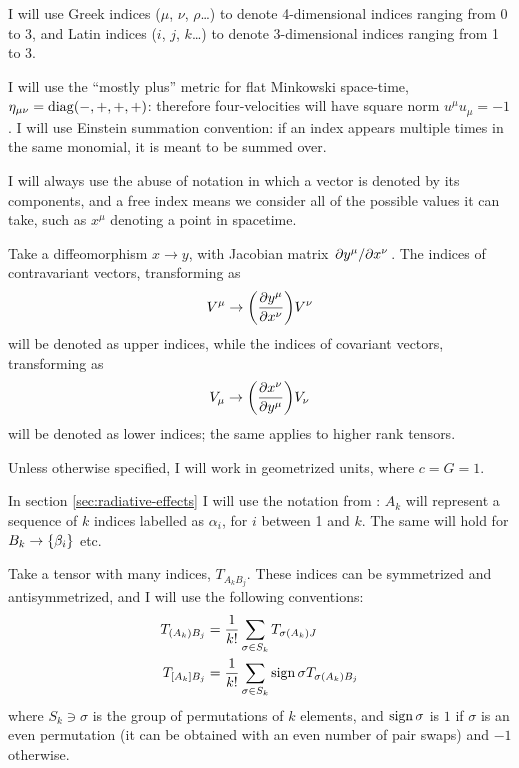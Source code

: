 \documentclass[main.tex]{subfiles}
\begin{document}
I will use Greek indices ($\mu$, $\nu$, $\rho$\dots) to denote 4-dimensional indices ranging from 0 to 3, and Latin indices ($i$, $j$, $k$\dots) to denote 3-dimensional indices ranging from 1 to 3.

I will use the ``mostly plus'' metric for flat Minkowski space-time, $\eta_{\mu \nu} = \operatorname{diag}(-, +, +, +)$: therefore four-velocities will have square norm \(u^\mu u_\mu = -1\).
I will use Einstein summation convention: if an index appears multiple times in the same monomial, it is meant to be summed over.

I will always use the abuse of notation in which a vector is denoted by its components, and a free index means we consider all of the possible values it can take, such as \(x^\mu\) denoting a point in spacetime.

Take a diffeomorphism $x \rightarrow y$, with Jacobian matrix $\pdv*{y^\mu}{x^\nu}$.
The indices of contravariant vectors, transforming as
\begin{equation}
    V^\mu \rightarrow \qty( \pdv{y^\mu}{x^\nu})  V^\nu
\end{equation}
will be denoted as upper indices, while the indices of covariant vectors, transforming as
\begin{equation}
V_\mu \rightarrow \qty( \pdv{x^\nu}{y^\mu})  V_\nu
\end{equation}
will be denoted as lower indices; the same applies to higher rank tensors.

Unless otherwise specified, I will work in geometrized units, where $c = G = 1$.

In section \ref{sec:radiative-effects} I will use the notation from \textcite[]{Thorne:1981feb}: \(A_k\) will represent a sequence of \(k\) indices labelled as \(\alpha_i\), for \(i\) between 1 and \(k\). The same will hold for \(B_k \rightarrow \qty{\beta_i}\) etc.

Take a tensor with many indices, \(T_{A_k B_j}\). These indices can be symmetrized and antisymmetrized, and I will use the following conventions:
\begin{align}
    T_{(A_k) B_j } &= \frac{1}{k!} \sum_{\sigma \in S_k} T_{\sigma(A_k)J} \\
    T_{[A_k]B_j} &= \frac{1}{k!} \sum_{\sigma \in S_k} \sign{\sigma} T_{\sigma(A_k)B_j}
\end{align}
where \(S_k \ni \sigma \) is the group of permutations of $k$ elements, and $\operatorname{sign}{\sigma}$ is $1$ if $\sigma$ is an even permutation (it can be obtained with an even number of pair swaps) and $-1$ otherwise.

% 
\end{document}
